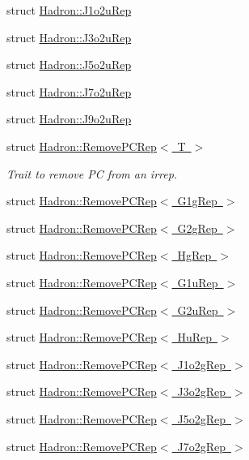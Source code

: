 \begin{DoxyCompactItemize}
struct \mbox{\hyperlink{structHadron_1_1J1o2uRep}{Hadron\+::\+J1o2u\+Rep}}
\item 
struct \mbox{\hyperlink{structHadron_1_1J3o2uRep}{Hadron\+::\+J3o2u\+Rep}}
\item 
struct \mbox{\hyperlink{structHadron_1_1J5o2uRep}{Hadron\+::\+J5o2u\+Rep}}
\item 
struct \mbox{\hyperlink{structHadron_1_1J7o2uRep}{Hadron\+::\+J7o2u\+Rep}}
\item 
struct \mbox{\hyperlink{structHadron_1_1J9o2uRep}{Hadron\+::\+J9o2u\+Rep}}
\item 
struct \mbox{\hyperlink{structHadron_1_1RemovePCRep}{Hadron\+::\+Remove\+P\+C\+Rep$<$ T $>$}}
\begin{DoxyCompactList}\small\item\em Trait to remove PC from an irrep. \end{DoxyCompactList}\item 
struct \mbox{\hyperlink{structHadron_1_1RemovePCRep_3_01G1gRep_01_4}{Hadron\+::\+Remove\+P\+C\+Rep$<$ G1g\+Rep $>$}}
\item 
struct \mbox{\hyperlink{structHadron_1_1RemovePCRep_3_01G2gRep_01_4}{Hadron\+::\+Remove\+P\+C\+Rep$<$ G2g\+Rep $>$}}
\item 
struct \mbox{\hyperlink{structHadron_1_1RemovePCRep_3_01HgRep_01_4}{Hadron\+::\+Remove\+P\+C\+Rep$<$ Hg\+Rep $>$}}
\item 
struct \mbox{\hyperlink{structHadron_1_1RemovePCRep_3_01G1uRep_01_4}{Hadron\+::\+Remove\+P\+C\+Rep$<$ G1u\+Rep $>$}}
\item 
struct \mbox{\hyperlink{structHadron_1_1RemovePCRep_3_01G2uRep_01_4}{Hadron\+::\+Remove\+P\+C\+Rep$<$ G2u\+Rep $>$}}
\item 
struct \mbox{\hyperlink{structHadron_1_1RemovePCRep_3_01HuRep_01_4}{Hadron\+::\+Remove\+P\+C\+Rep$<$ Hu\+Rep $>$}}
\item 
struct \mbox{\hyperlink{structHadron_1_1RemovePCRep_3_01J1o2gRep_01_4}{Hadron\+::\+Remove\+P\+C\+Rep$<$ J1o2g\+Rep $>$}}
\item 
struct \mbox{\hyperlink{structHadron_1_1RemovePCRep_3_01J3o2gRep_01_4}{Hadron\+::\+Remove\+P\+C\+Rep$<$ J3o2g\+Rep $>$}}
\item 
struct \mbox{\hyperlink{structHadron_1_1RemovePCRep_3_01J5o2gRep_01_4}{Hadron\+::\+Remove\+P\+C\+Rep$<$ J5o2g\+Rep $>$}}
\item 
struct \mbox{\hyperlink{structHadron_1_1RemovePCRep_3_01J7o2gRep_01_4}{Hadron\+::\+Remove\+P\+C\+Rep$<$ J7o2g\+Rep $>$}}
\item 

\end{DoxyCompactItemize}
